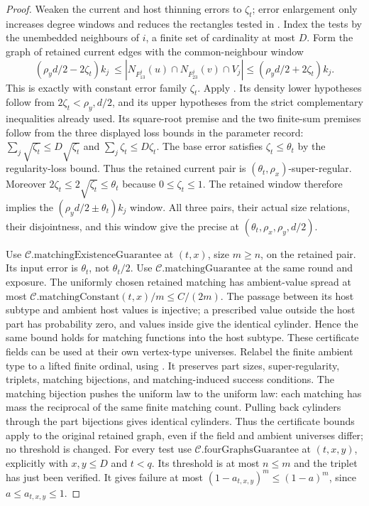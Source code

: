 \begin{proof}
Weaken the current and host thinning errors to $\zeta_t$; error
enlargement only increases degree windows and reduces the rectangles
tested in .
Index the tests by the unembedded neighbours of $i$, a finite set of
cardinality at most $D$. Form the graph of retained current edges with
the common-neighbour window
\[
(\rho_y d/2-2\zeta_t)k_j\ \le
 |N_{F_{13}^j}(u)\cap N_{F_{23}^j}(v)\cap V_j|
 \le (\rho_y d/2+2\zeta_t)k_j.
\]
This is exactly  with constant
error family $\zeta_t$. Apply
.
Its density lower hypotheses follow from $2\zeta_t<\rho_y,d/2$,
and its upper hypotheses from the strict complementary inequalities
already used. Its square-root premise and the two finite-sum premises
follow from the three displayed loss bounds in the parameter record:
$\sum_j\sqrt{\zeta_t}\le D\sqrt{\zeta_t}$ and
$\sum_j\zeta_t\le D\zeta_t$.
The base error satisfies $\zeta_t\le\theta_t$ by the regularity-loss
bound. Thus the retained current pair is
$(\theta_t,\rho_x)$-super-regular. Moreover
$2\zeta_t\le2\sqrt{\zeta_t}\le\theta_t$ because
$0\le\zeta_t\le1$. The retained window therefore implies the
$(\rho_y d/2\pm\theta_t)k_j$ window. All three pairs, their actual
size relations, their disjointness, and this window give the precise
 at $(\theta_t,\rho_x,\rho_y,d/2)$.

Use $\mathcal C.\mathrm{matchingExistenceGuarantee}$ at $(t,x)$,
size $m\ge n$, on the retained pair. Its input error is $\theta_t$,
not $\theta_t/2$. Use
$\mathcal C.\mathrm{matchingGuarantee}$ at the same round and
exposure. The uniformly chosen retained matching has ambient-value
spread at most
$\mathcal C.\mathrm{matchingConstant}(t,x)/m\le C/(2m)$.
The passage between its host subtype and ambient host values is
injective; a prescribed value outside the host part has probability
zero, and values inside give the identical cylinder. Hence the same
bound holds for matching functions into the host subtype.
These certificate fields can be used at their own vertex-type universes.
Relabel the finite ambient type to a lifted finite ordinal, using
. It preserves part sizes,
super-regularity, triplets, matching bijections, and matching-induced
success conditions. The matching bijection pushes the uniform law to
the uniform law: each matching has mass the reciprocal of the same
finite matching count. Pulling back cylinders through the part
bijections gives identical cylinders. Thus the certificate bounds apply
to the original retained graph, even if the field and ambient universes
differ; no threshold is changed.
For every test use
$\mathcal C.\mathrm{fourGraphsGuarantee}$ at $(t,x,y)$, explicitly
with $x,y\le D$ and $t<q$. Its threshold is at most $n\le m$ and
the triplet has just been verified. It gives failure at most
$(1-a_{t,x,y})^m\le(1-a)^m$, since $a\le a_{t,x,y}\le1$.


\end{proof}
